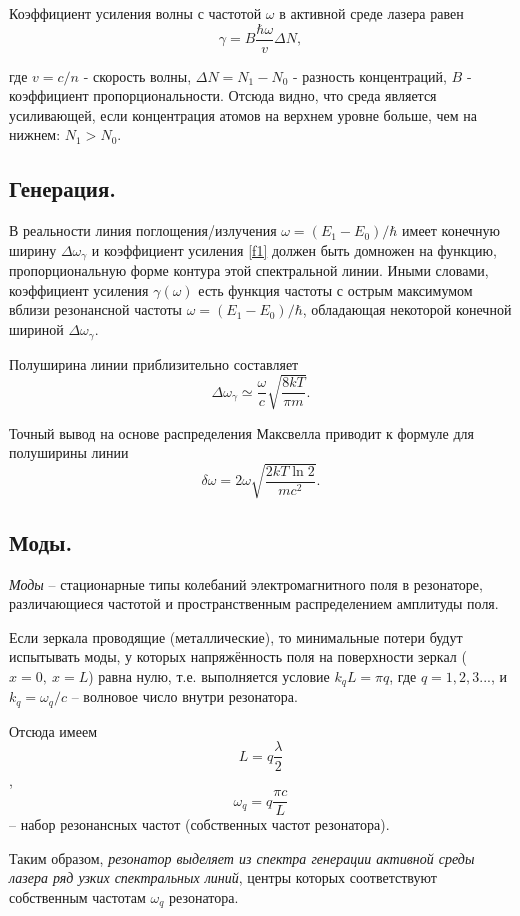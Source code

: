 \documentclass[a4paper, 12pt, twoside]{article}
\begin{document}
	Коэффициент усиления волны с частотой $\omega$ в активной среде лазера равен 
	\begin{equation}
	\label{f1}
	\gamma = B \dfrac{\hbar \omega}{v} \Delta N,
	\end{equation}
	
	где $v = c / n$ - скорость волны, $\Delta N = N_1-N_0$ - разность концентраций, $B$ - коэффициент пропорциональности. Отсюда видно, что среда является усиливающей, если концентрация атомов на верхнем уровне больше, чем на нижнем: $N_1 > N_0$.
	
	\subsection{Генерация.}
	
	В реальности линия поглощения/излучения $\omega = (E_1-E_0)/\hbar$ имеет конечную ширину $\Delta \omega_\gamma$ и коэффициент усиления \eqref{f1} должен быть домножен на функцию, пропорциональную форме контура этой спектральной линии. Иными словами, коэффициент усиления $\gamma(\omega)$ есть функция частоты с острым максимумом вблизи резонансной частоты $\omega = (E_1-E_0)/\hbar$, обладающая некоторой конечной шириной $\Delta \omega_\gamma$.
	
	Полуширина линии приблизительно составляет $$\Delta \omega_\gamma \simeq \dfrac{\omega}{c}\sqrt{\dfrac{8k T}{\pi m}}.$$
	
	Точный вывод на основе распределения Максвелла приводит к формуле для полуширины линии $$\delta \omega = 2\omega \sqrt{\dfrac{2kT\ln 2}{mc^2}}.$$ 
	
	\subsection{Моды.}
	
	\textit{Моды} -- стационарные типы колебаний электромагнитного поля в резонаторе, различающиеся частотой и пространственным распределением амплитуды поля.
	
	Если зеркала проводящие (металлические), то минимальные потери будут испытывать моды, у которых напряжённость поля на поверхности зеркал ($x = 0, ~ x = L$) равна нулю, т.е. выполняется условие $k_qL = \pi q$, где $q = 1,2,3...$, и $k_q = \omega_q/c$ -- волновое число внутри резонатора.
	
	Отсюда имеем $$L = q \dfrac{\lambda}{2}$$, $$\omega_q = q\dfrac{\pi c}{L}$$ -- набор резонансных частот (собственных частот резонатора).
	
	Таким образом, \textit{резонатор выделяет из спектра генерации активной среды лазера ряд узких спектральных линий}, центры которых соответствуют собственным частотам $\omega_q$ резонатора.
	
\end{document}
